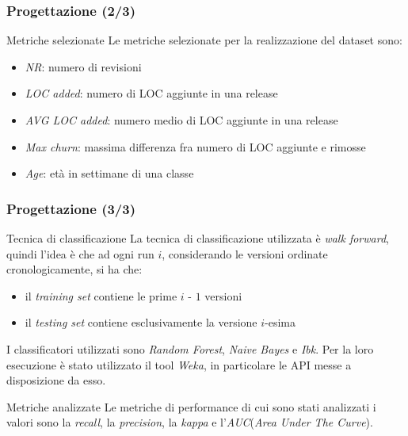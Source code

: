 \documentclass[
	usepdftitle=false,
	xcolor={table, dvipsnames},
	hyperref={
		pdftitle={Machine Learning per Software Engineering},
    	pdfauthor={Alessando Chillotti}
    }
]{beamer}
\begin{document}
\begin{frame}
\frametitle{Progettazione (2/3)}
\begin{block}{Metriche selezionate}
Le metriche selezionate per la realizzazione del dataset sono:
\fboxsep=0pt
%
\hfill%
{%
\begin{minipage}[t]{0.49\linewidth}
\begin{itemize}
\item \textit{NR}: numero di revisioni
\item \textit{LOC added}: numero di LOC aggiunte in una release
\item \textit{AVG LOC added}: numero medio di LOC aggiunte in una release
\item \textit{Max churn}: massima differenza fra numero di LOC aggiunte e rimosse
\item \textit{Age}: età in settimane di una classe
\end{itemize}
\end{minipage}
}
\end{block}
\end{frame}

\begin{frame}
\frametitle{Progettazione (3/3)}
\begin{block}{Tecnica di classificazione}
La tecnica di classificazione utilizzata è \textit{walk forward}, quindi l'idea è che ad ogni run $i$, considerando le versioni ordinate cronologicamente, si ha che:
\begin{itemize}
\item il \textit{training set} contiene le prime $i$ - $1$ versioni
\item il \textit{testing set} contiene esclusivamente la versione $i$-esima
\end{itemize}

I classificatori utilizzati sono \textit{Random Forest}, \textit{Naive Bayes} e \textit{Ibk}. Per la loro esecuzione è stato utilizzato il tool \textit{Weka}, in particolare le API messe a disposizione da esso.
\end{block}

\begin{block}{Metriche analizzate}
Le metriche di performance di cui sono stati analizzati i valori sono la \textit{recall}, la \textit{precision}, la \textit{kappa} e l'\textit{AUC}(\textit{Area Under The Curve}).
\end{block}
\end{frame}
\end{document}
